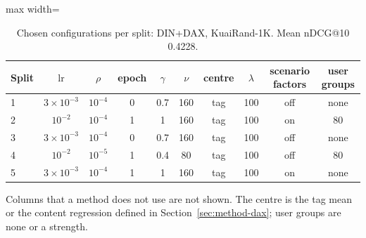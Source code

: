 \begin{table}[tbp]
\centering
\footnotesize
\caption{Chosen configurations per split: DIN+DAX, KuaiRand-1K. Mean nDCG@10 0.4228.}
\label{tab:grid15}
\begin{adjustbox}{max width=\linewidth}
\begin{tabular}{lccccccccc}
\toprule
Split & $\mathrm{lr}$ & $\rho$ & epoch & $\gamma$ & $\nu$ & centre & $\lambda$ & scenario factors & user groups \\
\midrule
1 & $3\times10^{-3}$ & $10^{-4}$ & 0 & 0.7 & 160 & tag & 100 & off & none \\
2 & $10^{-2}$ & $10^{-4}$ & 1 & 1 & 160 & tag & 100 & on & 80 \\
3 & $3\times10^{-3}$ & $10^{-4}$ & 0 & 0.7 & 160 & tag & 100 & off & none \\
4 & $10^{-2}$ & $10^{-5}$ & 1 & 0.4 & 80 & tag & 100 & off & 80 \\
5 & $3\times10^{-3}$ & $10^{-4}$ & 1 & 1 & 160 & tag & 100 & on & none \\
\bottomrule
\end{tabular}
\end{adjustbox}
\par\smallskip
\begin{minipage}{\linewidth}\raggedright\footnotesize Columns that a method does not use are not shown. The centre is the tag mean or the content regression defined in Section~\ref{sec:method-dax}; user groups are none or a strength.\end{minipage}
\end{table}
